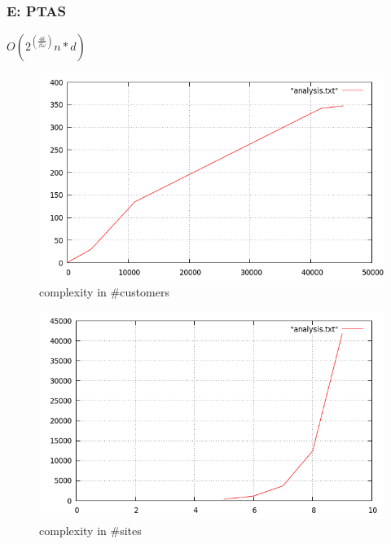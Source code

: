 \documentclass{beamer}
\begin{document}
\begin{frame}[fragile]
\frametitle{E: PTAS}
$O(2^{(\frac{4k}{\beta\omega})}n*d)$
\begin{figure}[ht]
	\centering
	\includegraphics[scale=0.2]{ESeeder_complexity_in_n.png}
	\caption{complexity in \#customers}
\end{figure}
\begin{figure}[ht]
	\centering
	\includegraphics[scale=0.2]{ESeeder_complexity_in_k.png}
	\caption{complexity in \#sites}
\end{figure}
\end{frame}
\end{document}
